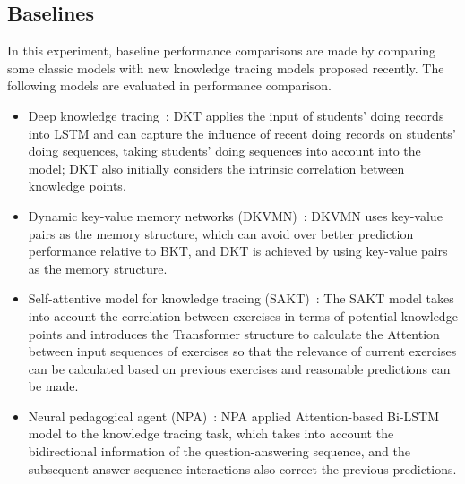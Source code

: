 \subsection{Baselines}
In this experiment, baseline performance comparisons are made by comparing some classic models with new knowledge tracing models proposed recently. The following models are evaluated in performance comparison.
\begin{itemize}
    \item Deep knowledge tracing~\cite{piech2015deep}: DKT applies the input of students' doing records into LSTM and can capture the influence of recent doing records on students' doing sequences, taking students' doing sequences into account into the model; DKT also initially considers the intrinsic correlation between knowledge points.
    \item Dynamic key-value memory networks (DKVMN)~\cite{zhang2017dynamic}: DKVMN uses key-value pairs as the memory structure, which can avoid over better prediction performance relative to BKT, and DKT is achieved by using key-value pairs as the memory structure.
    \item Self-attentive model for knowledge tracing (SAKT)~\cite{sakt2019}: The SAKT model takes into account the correlation between exercises in terms of potential knowledge points and introduces the Transformer structure to calculate the Attention between input sequences of exercises so that the relevance of current exercises can be calculated based on previous exercises and reasonable predictions can be made.
    \item Neural pedagogical agent (NPA)~\cite{Lee2019CreatingAN}: NPA applied Attention-based Bi-LSTM model to the knowledge tracing task, which takes into account the bidirectional information of the question-answering sequence, and the subsequent answer sequence interactions also correct the previous predictions.
\end{itemize}

